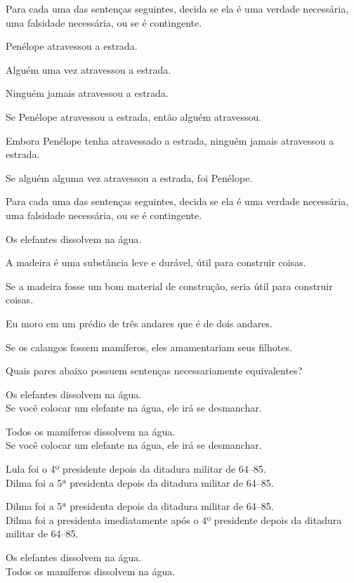 \practiceproblems
\problempart
\label{pr.EnglishTautology2}
Para cada uma das sentenças seguintes, decida se ela é uma verdade necessária, uma falsidade necessária, ou se é contingente.
\begin{earg}
\item Penélope atravessou a estrada.
\item Alguém uma vez atravessou a estrada.
\item Ninguém jamais atravessou a estrada.
\item Se Penélope atravessou a estrada, então alguém atravessou.
\item Embora Penélope tenha atravessado a estrada, ninguém jamais atravessou a estrada.
\item Se alguém alguma vez atravessou a estrada, foi Penélope.
\end{earg}

\problempart
Para cada uma das sentenças seguintes, decida se ela é uma verdade necessária, uma falsidade necessária, ou se é contingente.
\begin{earg}
\item Os elefantes dissolvem na água.
\item A madeira é uma substância leve e durável, útil para construir coisas.
\item Se a madeira fosse um bom material de construção, seria útil para construir coisas.
\item Eu moro em um prédio de três andares que é de dois andares.
\item Se os calangos fossem mamíferos, eles amamentariam seus filhotes.
\end{earg}

\problempart Quais pares abaixo possuem sentenças necessariamente equivalentes?

\begin{earg}
\item Os elefantes dissolvem na água.	\\
	Se você colocar um elefante na água, ele irá se desmanchar.
\item Todos os mamíferos dissolvem na água. \\		
	Se você colocar um elefante na água, ele irá se desmanchar. 
\item Lula foi o 4º presidente depois da ditadura militar de 64--85. \\
	 Dilma foi a 5ª presidenta depois da ditadura militar de 64--85. 
\item Dilma foi a 5ª presidenta depois da ditadura militar de 64--85. \\
	  Dilma foi a presidenta imediatamente após o 4º presidente depois da ditadura militar de 64--85.
\item Os elefantes dissolvem na água. 	\\	
	Todos os mamíferos dissolvem na água. 
\end{earg}

